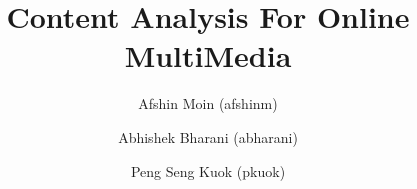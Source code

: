 \documentclass[11pt]{llncs}
\begin{document}
\pagestyle{empty} 
\title{Content Analysis For Online MultiMedia}
\author{Afshin Moin (afshinm)\institute{}
\and
Abhishek Bharani (abharani)\institute{}
\and 
Peng Seng Kuok (pkuok)\institute{}
}

\maketitle







\pagestyle{plain}




\end{document}
